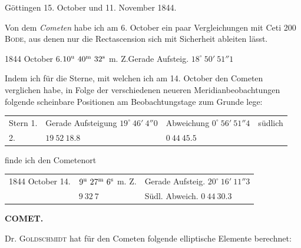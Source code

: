 \par{}\bigskip
\hypertarget{native-474-lower}{}
\begin{flushright}Göttingen 15. October und 11. November 1844.\end{flushright}

Von dem \emph{Cometen} habe ich am 6. October ein paar Vergleichungen mit Ceti 200 \textsc{Bode}, aus denen nur die Rectascension sich mit Sicherheit ableiten lässt.

\begin{center}
1844 October 6.\quad $10^{\rm u}\ 40^{\rm m}\ 32^{\rm s}$ m. Z.\quad Gerade Aufsteig. $18^\circ\ 50'\ 51''1$
\end{center}

Indem ich für die Sterne, mit welchen ich am 14. October den Cometen verglichen habe, in Folge der verschiedenen neueren Meridianbeobachtungen folgende scheinbare Positionen am Beobachtungstage zum Grunde lege:

\begin{center}
\setlength{\tabcolsep}{3pt}
\begin{tabular}{llll}
Stern 1. & \shortstack[l]{Gerade Aufsteigung\\$19^\circ\ 46'\ 4''0$} & \shortstack[l]{Abweichung\\$0^\circ\ 56'\ 51''4$} & südlich \\
\hfill 2. & \hfill $19\ 52\ 18.8$ & \hfill $0\ 44\ 45.5$ & \\
\end{tabular}
\end{center}
\noindent finde ich den Cometenort

\begin{center}
\setlength{\tabcolsep}{3pt}
\begin{tabular}{lll}
1844 October 14. & $9^{\rm u}\ 27^{\rm m}\ 6^{\rm s}$ m. Z. & Gerade Aufsteig. $20^\circ\ 16'\ 11''3$ \\
 & $9\ 32\ 7$ & Südl. Abweich. $0\ 44\ 30.3$ \\
\end{tabular}
\end{center}

\clearpage
\noindent{}%
%
\parbox[t]{\dimexpr\linewidth-24mm\relax}{\centering\footnotesize\bfseries COMET.\par}%
\makebox[12mm][r]{}\par\nobreak\medskip
Dr. \textsc{Goldschmidt} hat für den Cometen folgende elliptische Elemente berechnet:

